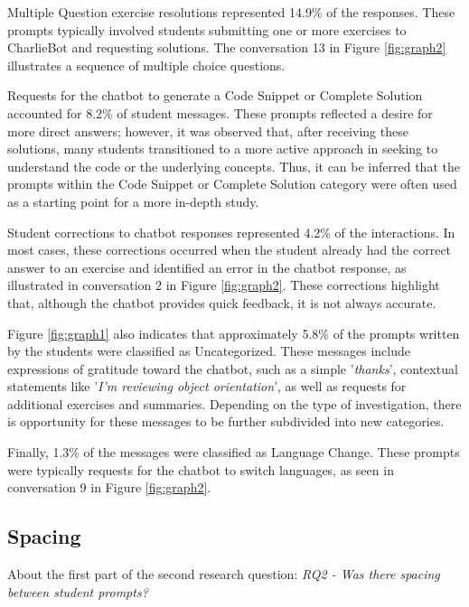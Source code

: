 \documentclass[runningheads]{llncs}
\begin{document}
Multiple Question exercise resolutions represented 14.9\% of the responses.
These prompts typically involved students submitting one or more exercises to
CharlieBot and requesting solutions. The conversation 13 in Figure
\ref{fig:graph2} illustrates a sequence of multiple choice questions.

Requests for the chatbot to generate a Code Snippet or Complete Solution accounted
for 8.2\% of student messages. These prompts reflected a desire for more
direct answers; however, it was observed that, after receiving these solutions,
many students transitioned to a more active approach in seeking to understand
the code or the underlying concepts. Thus, it can be inferred that the prompts
within the Code Snippet or Complete Solution category were often used as a
starting point for a more in-depth study.

Student corrections to chatbot responses represented 4.2\% of the interactions.
In most cases, these corrections occurred when the student already had the
correct answer to an exercise and identified an error in the chatbot response,
as illustrated in conversation 2 in Figure \ref{fig:graph2}. These corrections
highlight that, although the chatbot provides quick feedback, it is not always
accurate.

Figure \ref{fig:graph1} also indicates that approximately 5.8\% of the prompts
written by the students were classified as Uncategorized. These messages include
expressions of gratitude toward the chatbot, such as a simple '\textit{thanks}',
contextual statements like '\textit{I'm reviewing object orientation}', as well
as requests for additional exercises and summaries. Depending on the type of
investigation, there is opportunity for these messages to be further subdivided
into new categories.

Finally, 1.3\% of the messages were classified as Language Change. These prompts
were typically requests for the chatbot to switch languages, as seen in
conversation 9 in Figure \ref{fig:graph2}.

\subsection{Spacing}

About the first part of the second research question: \textit{RQ2 - Was there
spacing between student prompts?}
\end{document}
